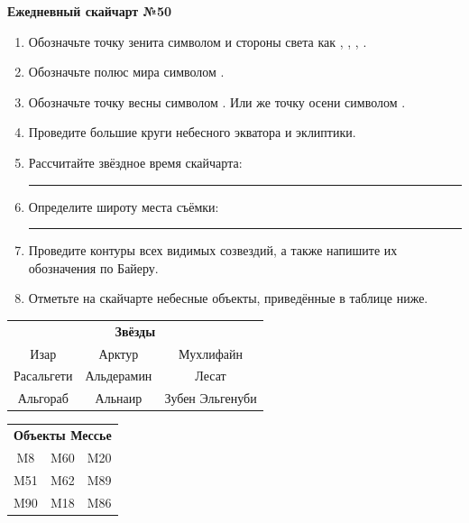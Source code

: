 \documentclass{./SAS-class-skygen}
\begin{document}
    
    
    
	\begin{center}
		\large\textbf{Ежедневный скайчарт №50}
	\end{center}

	\begin{enumerate}
		\item Обозначьте точку зенита символом  и стороны света как , , , .
		\item Обозначьте полюс мира символом .
		\item Обозначьте точку весны символом \Aries. Или же точку осени символом \Libra.
		\item Проведите большие круги небесного экватора и эклиптики.
		\item Рассчитайте звёздное время скайчарта: \rule{2cm}{0.4pt}
		\item Определите широту места съёмки: \rule{2cm}{0.4pt}
		\item Проведите контуры всех видимых созвездий, а также напишите их обозначения по Байеру.
		\item Отметьте на скайчарте небесные объекты, приведённые в таблице ниже.
	\end{enumerate}
	
    \vspace{0.5cm}

    \begin{table}[h!]
    \centering
    \begin{tabular}{ccc}
    \multicolumn{3}{c}{\textbf{Звёзды}} \\ Изар & Арктур & Мухлифайн \\
Расальгети & Альдерамин & Лесат \\
Альгораб & Альнаир & Зубен Эльгенуби \\

\end{tabular}
    \hfill
    \begin{tabular}{ccc}
    \multicolumn{3}{c}{\textbf{Объекты Мессье}} \\ M8 & M60 & M20 \\
M51 & M62 & M89 \\
M90 & M18 & M86 \\

\end{tabular}
    \end{table}
	
\end{document}
